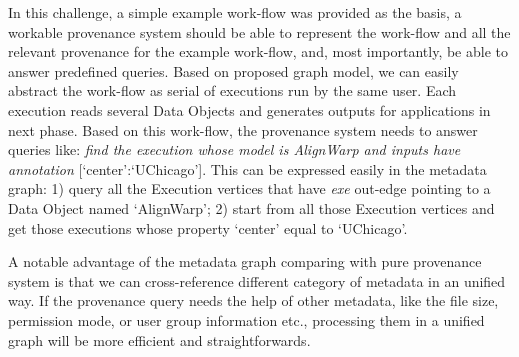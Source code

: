 In this challenge, a simple example work-flow was provided as the basis, a workable provenance system should be able to represent the work-flow and all the relevant provenance for the example work-flow, and, most importantly, be able to answer predefined queries. Based on proposed graph model, we can easily abstract the work-flow as serial of executions run by the same user. Each execution reads several Data Objects and generates outputs for applications in next phase. Based on this work-flow, the provenance system needs to answer queries like: \textit{find the execution whose model is AlignWarp and inputs have annotation} [`center':`UChicago']. This can be expressed easily in the metadata graph: 1) query all the Execution vertices that have \textit{exe} out-edge pointing to a Data Object named `AlignWarp'; 2) start from all those Execution vertices and get those executions whose property `center' equal to `UChicago'.

A notable advantage of the metadata graph comparing with pure provenance system is that we can cross-reference different category of metadata in an unified way. If the provenance query needs the help of other metadata, like the file size, permission mode, or user group information etc., processing them in a unified graph will be more efficient and straightforwards.





